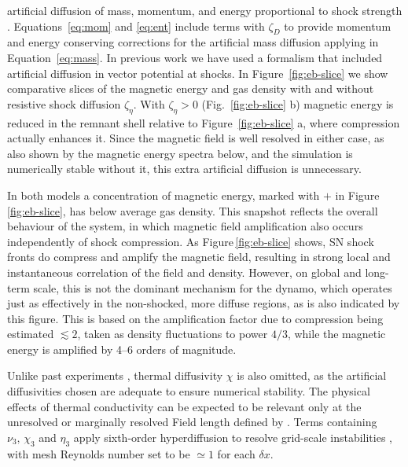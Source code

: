 \documentclass[preprint2]{aastex63}
\newcommand\dx{ {\delta x}}
\newcommand{\fg}[1]{\textcolor{mypurple}{#1}}
\begin{document}
 artificial diffusion of mass, momentum, and energy proportional to shock
 strength \citep[see][for details]{GMKSH20}.
 {Equations~\eqref{eq:mom} and \eqref{eq:ent} include terms with $\zeta_D$}
 {to} {provide momentum and energy conserving corrections for} {the}
 {artificial mass diffusion applying in Equation~\eqref{eq:mass}.}
 {In previous work \citet{Gent:2013b} we have used a formalism that
 included artificial diffusion in vector potential at shocks.
 In Figure~\ref{fig:eb-slice} we show comparative slices of the magnetic
 energy and gas density with and without resistive shock diffusion
 $\zeta_\eta$.
 With $\zeta_\eta>0$ (Fig.~\ref{fig:eb-slice} b) magnetic energy is reduced in the remnant shell relative to Figure~\ref{fig:eb-slice} a, where compression actually enhances it.}
 Since the magnetic field is well resolved in either case, as also
 shown by the magnetic energy spectra below, and the simulation is
 numerically stable without it, this extra artificial
 diffusion is unnecessary.

 In both models a concentration of magnetic energy, marked with $+$ in
 Figure\,\ref{fig:eb-slice}, has below average gas density.
 \fg{This snapshot reflects the overall behaviour of the system, in which
 magnetic field amplification also occurs independently of shock compression.
 As Figure\,\ref{fig:eb-slice} shows, SN shock fronts do compress and amplify
 the magnetic field, resulting in strong local and instantaneous correlation
 of the field and density.
 However, on global and long-term scale, this is not the dominant mechanism
 for the dynamo, which operates just as effectively in the non-shocked, more
 diffuse regions, as is also indicated by this figure.
 This is based on the amplification factor due to compression being estimated
 $\lesssim2$, taken as density fluctuations to power $4/3$, while the magnetic
 energy is amplified by 4--6 orders of magnitude.}

  {Unlike past} experiments \citep{Gent:2013b,Gent:2013a,GMKSH20},
 thermal diffusivity $\chi$ is {also} omitted, as the artificial diffusivities
 {chosen} are adequate to ensure numerical stability.
 {The} physical effects of thermal conductivity can be expected to be
 relevant only at the unresolved or marginally resolved Field length defined
 by \citet[][named after George Field, not the magnetic field]{BM90}.
 Terms containing $\nu_3,\,\chi_3$ and $\eta_3$ apply sixth-order hyperdiffusion
 to resolve grid-scale instabilities \citep[see, e.g.,][]{ABGS02,HB04}, {
 with mesh Reynolds number set to be $\simeq1$ for each $\dx$}.
\end{document}
